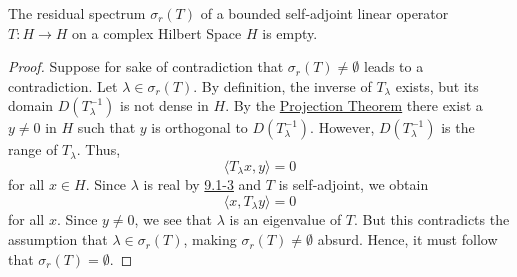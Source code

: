 \begin{theorem}
    The residual spectrum \( \sigma_r(T) \) of a bounded self-adjoint linear operator \( T: H \to H  \) on a complex Hilbert Space \( H  \) is empty. 
\end{theorem}
\begin{proof}
    Suppose for sake of contradiction that \( \sigma_r(T) \neq \emptyset \) leads to a contradiction. Let \( \lambda \in \sigma_r(T) \). By definition, the inverse of \( {T}_{\lambda} \) exists, but its domain \( D(T^{-1}_{\lambda}) \) is not dense in \( H  \). By the {\hyperref[Projection Theorem]{Projection Theorem}} there exist a \( y \neq 0  \) in \( H  \) such that \( y  \) is orthogonal to \( D({T}_{\lambda}^{-1}) \). However, \( D(T^{-1}_{\lambda}) \) is the range of \( {T}_{\lambda} \). Thus,  
    \[  \langle {T}_{\lambda} x  ,  y  \rangle = 0  \] 
    for all \( x \in H \). Since \( \lambda  \) is real by {\hyperref[9.1-3]{9.1-3}} and \( T  \) is self-adjoint, we obtain  
    \[  \langle x  ,  {T}_{\lambda}y  \rangle = 0  \]
    for all \( x  \). Since \( y \neq 0  \), we see that \( \lambda  \) is an eigenvalue of \( T  \). But this contradicts the assumption that \( \lambda \in {\sigma}_{r}(T) \), making \( \sigma_r(T) \neq \emptyset \) absurd. Hence, it must follow that \( \sigma_r(T) = \emptyset \).
\end{proof}
